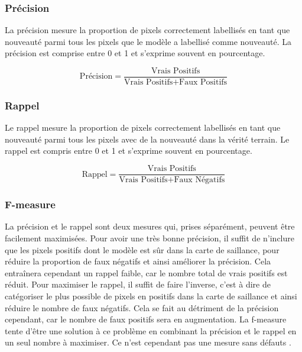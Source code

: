 	\subsubsection{Précision}

	La précision mesure la proportion de pixels correctement labellisés en tant que nouveauté parmi tous les pixels que le modèle a labellisé comme nouveauté. La précision est comprise entre 0 et 1 et s'exprime souvent en pourcentage.
	
	\begin{equation}
		\text{Précision} = \frac{\text{Vrais Positifs}}{\text{Vrais Positifs} + \text{Faux Positifs}}
	\end{equation}

	\subsubsection{Rappel}

	Le rappel mesure la proportion de pixels correctement labellisés en tant que nouveauté parmi tous les pixels avec de la nouveauté dans la vérité terrain. Le rappel est compris entre 0 et 1 et s'exprime souvent en pourcentage.

	\begin{equation}
		\text{Rappel} = \frac{\text{Vrais Positifs}}{\text{Vrais Positifs} + \text{Faux Négatifs}}
	\end{equation}

	\subsubsection{F-measure}

	La précision et le rappel sont deux mesures qui, prises séparément, peuvent être facilement maximisées. Pour avoir une très bonne précision, il suffit de n'inclure que les pixels positifs dont le modèle est sûr dans la carte de saillance, pour réduire la proportion de faux négatifs et ainsi améliorer la précision. Cela entraînera cependant un rappel faible, car le nombre total de vrais positifs est réduit. Pour maximiser le rappel, il suffit de faire l'inverse, c'est à dire de catégoriser le plus possible de pixels en positifs dans la carte de saillance et ainsi réduire le nombre de faux négatifs. Cela se fait au détriment de la précision cependant, car le nombre de faux positifs sera en augmentation. La f-measure \cite{hripcsak-fmeasure} tente d'être une solution à ce problème en combinant la précision et le rappel en un seul nombre à maximiser. Ce n'est cependant pas une mesure sans défauts \cite{powers-fmeasure}.

